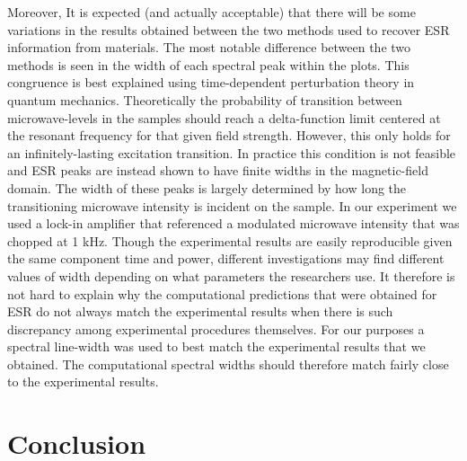 \documentclass[oneside, astronomy, noacknowlegments]{BYUPhys}
\begin{document}
Moreover, It is expected (and actually acceptable) that there will be some variations in the results obtained between the two methods used to recover ESR information from materials. The most notable difference between the two methods is seen in the width of each spectral peak within the plots. This congruence is best explained using time-dependent perturbation theory in quantum mechanics. Theoretically the probability of transition between microwave-levels in the samples should reach a delta-function limit centered at the resonant frequency for that given field strength. However, this only holds for an infinitely-lasting excitation transition. In practice this condition is not feasible and ESR peaks are instead shown to have finite widths in the magnetic-field domain. The width of these peaks is largely determined by how long the transitioning microwave intensity is incident on the sample. In our experiment we used a lock-in amplifier that referenced a modulated microwave intensity that was chopped at 1 kHz. Though the experimental results are easily reproducible given the same component time and power, different investigations may find different values of width depending on what parameters the researchers use. It therefore is not hard to explain why the computational predictions that were obtained for ESR do not always match the experimental results when there is such discrepancy among experimental procedures themselves. For our purposes a spectral line-width was used to best match the experimental results that we obtained. The computational spectral widths should therefore match fairly close to the experimental results.

\section{Conclusion}
\end{document}
